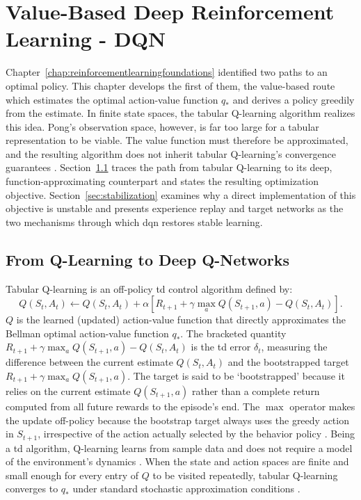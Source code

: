 \chapter{Value-Based Deep Reinforcement Learning - DQN}
\label{chap:dqn}

Chapter~\ref{chap:reinforcementlearningfoundations} identified two paths to an optimal policy. This chapter develops the first of them, the value-based route which estimates the optimal action-value function $q_*$ and derives a policy greedily from the estimate. In finite state spaces, the tabular Q-learning algorithm \citep{Watkins1989LearningFD} realizes this idea. Pong's observation space, however, is far too large for a tabular representation to be viable. The value function must therefore be approximated, and the resulting algorithm does not inherit tabular Q-learning's convergence guarantees \citep[Ch.~11]{suttonReinforcementLearningIntroduction2020}. Section~\ref{sec:fromqlearningtodqn} traces the path from tabular Q-learning to its deep, function-approximating counterpart and states the resulting optimization objective. Section~\ref{sec:stabilization} examines why a direct implementation of this objective is unstable and presents experience replay and target networks as the two mechanisms through which \acrshort{dqn} \citep{mnihHumanlevelControlDeep2015} restores stable learning.

\section{From Q-Learning to Deep Q-Networks}
\label{sec:fromqlearningtodqn}
Tabular Q-learning is an off-policy \acrshort{td} control algorithm defined by:
\begin{equation}\label{eq:q_learning}
	Q\left(S_t, A_t\right) \leftarrow Q\left(S_t, A_t\right) + \alpha \left[R_{t+1} + \gamma \max_a Q\left(S_{t+1}, a\right) - Q\left(S_t, A_t\right)\right].
\end{equation}
$Q$ is the learned (updated) action-value function that directly approximates the Bellman optimal action-value function $q_*$. The bracketed quantity $R_{t+1} + \gamma \max_a Q\left(S_{t+1}, a\right) - Q\left(S_t, A_t\right)$ is the \acrshort{td} error $\delta_t$, measuring the difference between the current estimate $Q\left(S_t, A_t\right)$ and the bootstrapped target $R_{t+1} + \gamma \max_a Q\left(S_{t+1}, a\right)$. The target is said to be `bootstrapped' because it relies on the current estimate $Q\left(S_{t+1}, a\right)$ rather than a complete return computed from all future rewards to the episode's end. The $\max$ operator makes the update off-policy because the bootstrap target always uses the greedy action in $S_{t+1}$, irrespective of the action actually selected by the behavior policy \citep[pp.~131, 257]{suttonReinforcementLearningIntroduction2020}. Being a \acrshort{td} algorithm, Q-learning learns from sample data and does not require a model of the environment's dynamics \citep[p.~119]{suttonReinforcementLearningIntroduction2020}. When the state and action spaces are finite and small enough for every entry of $Q$ to be visited repeatedly, tabular Q-learning converges to $q_*$ under standard stochastic approximation conditions \citep[p.~33]{suttonReinforcementLearningIntroduction2020}.

